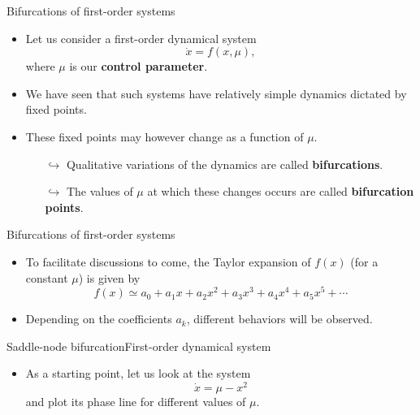 \documentclass[usenames,dvipsnames,svgnames,10pt,aspectratio=169]{beamer}
\begin{document}
\begin{frame}[t, c]{Bifurcations of first-order systems}{}
	\begin{itemize}
		\item Let us consider a first-order dynamical system
		$$\dot{x} = f(x, \mu),$$
		where $\mu$ is our \alert{\textbf{control parameter}}.

		\bigskip

		\item We have seen that such systems have relatively simple dynamics dictated by fixed points.

		\bigskip

		\item These fixed points may however change as a function of $\mu$.
		\begin{itemize}
			\item[$\hookrightarrow$] Qualitative variations of the dynamics are called \alert{\textbf{bifurcations}}.
			\item[$\hookrightarrow$] The values of $\mu$ at which these changes occurs are called \alert{\textbf{bifurcation points}}.
		\end{itemize}
	\end{itemize}

	\vspace{2cm}
\end{frame}

\begin{frame}[t, c]{Bifurcations of first-order systems}{}
	\begin{itemize}
		\item To facilitate discussions to come, the Taylor expansion of $f(x)$ (for a constant $\mu$) is given by
		$$f(x) \simeq a_0 + a_1 x + a_2 x^2 + a_3 x^3 + a_4 x^4 + a_5 x^5 + \cdots$$

		\medskip

		\item Depending on the coefficients $a_k$, different behaviors will be observed.
	\end{itemize}

	\vspace{1cm}
\end{frame}

\begin{frame}[t, c]{Saddle-node bifurcation}{First-order dynamical system}
	\begin{itemize}
		\item As a starting point, let us look at the system
		$$\dot{x} = \mu - x^2$$
		and plot its phase line for different values of $\mu$.
	\end{itemize}

	\vspace{1cm}
\end{frame}
\end{document}
